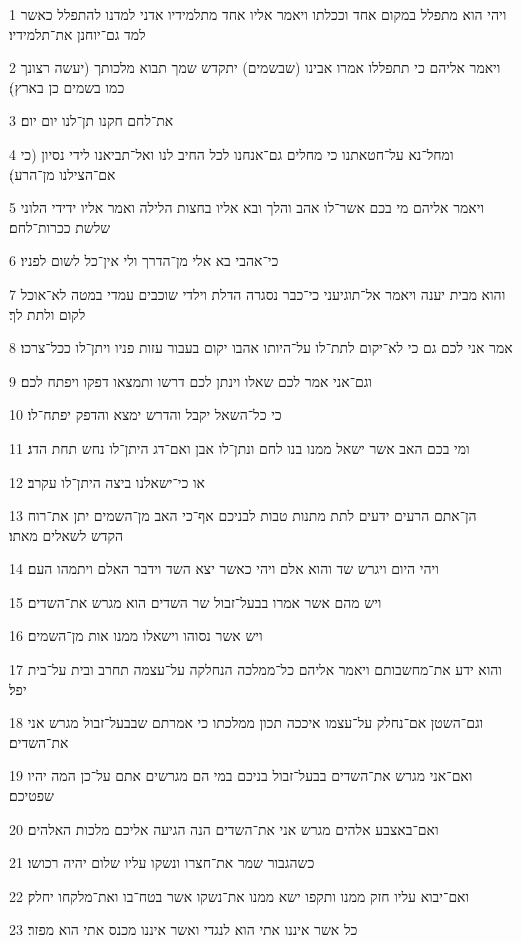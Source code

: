 \par 1 ויהי הוא מתפלל במקום אחד וככלתו ויאמר אליו אחד מתלמידיו אדני למדנו להתפלל כאשר למד גם־יוחנן את־תלמידיו׃
\par 2 ויאמר אליהם כי תתפללו אמרו אבינו (שבשמים) יתקדש שמך תבוא מלכותך (יעשה רצונך כמו בשמים כן בארץ)׃
\par 3 את־לחם חקנו תן־לנו יום יום׃
\par 4 ומחל־נא על־חטאתנו כי מחלים גם־אנחנו לכל החיב לנו ואל־תביאנו לידי נסיון (כי אם־הצילנו מן־הרע)׃
\par 5 ויאמר אליהם מי בכם אשר־לו אהב והלך ובא אליו בחצות הלילה ואמר אליו ידידי הלוני שלשת ככרות־לחם׃
\par 6 כי־אהבי בא אלי מן־הדרך ולי אין־כל לשום לפניו׃
\par 7 והוא מבית יענה ויאמר אל־תוגיעני כי־כבר נסגרה הדלת וילדי שוכבים עמדי במטה לא־אוכל לקום ולתת לך׃
\par 8 אמר אני לכם גם כי לא־יקום לתת־לו על־היותו אהבו יקום בעבור עזות פניו ויתן־לו ככל־צרכו׃
\par 9 וגם־אני אמר לכם שאלו וינתן לכם דרשו ותמצאו דפקו ויפתח לכם׃
\par 10 כי כל־השאל יקבל והדרש ימצא והדפק יפתח־לו׃
\par 11 ומי בכם האב אשר ישאל ממנו בנו לחם ונתן־לו אבן ואם־דג היתן־לו נחש תחת הדג׃
\par 12 או כי־ישאלנו ביצה היתן־לו עקרב׃
\par 13 הן־אתם הרעים ידעים לתת מתנות טבות לבניכם אף־כי האב מן־השמים יתן את־רוח הקדש לשאלים מאתו׃
\par 14 ויהי היום ויגרש שד והוא אלם ויהי כאשר יצא השד וידבר האלם ויתמהו העם׃
\par 15 ויש מהם אשר אמרו בבעל־זבול שר השדים הוא מגרש את־השדים׃
\par 16 ויש אשר נסוהו וישאלו ממנו אות מן־השמים׃
\par 17 והוא ידע את־מחשבותם ויאמר אליהם כל־ממלכה הנחלקה על־עצמה תחרב ובית על־בית יפל׃
\par 18 וגם־השטן אם־נחלק על־עצמו איככה תכון ממלכתו כי אמרתם שבבעל־זבול מגרש אני את־השדים׃
\par 19 ואם־אני מגרש את־השדים בבעל־זבול בניכם במי הם מגרשים אתם על־כן המה יהיו שפטיכם׃
\par 20 ואם־באצבע אלהים מגרש אני את־השדים הנה הגיעה אליכם מלכות האלהים׃
\par 21 כשהגבור שמר את־חצרו ונשקו עליו שלום יהיה רכושו׃
\par 22 ואם־יבוא עליו חזק ממנו ותקפו ישא ממנו את־נשקו אשר בטח־בו ואת־מלקחו יחלק׃
\par 23 כל אשר איננו אתי הוא לנגדי ואשר איננו מכנס אתי הוא מפזר׃
